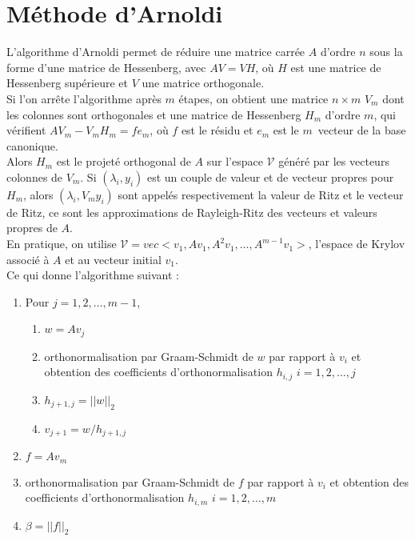 \section{Méthode d'Arnoldi}
\label{arnoldi}
L'algorithme d'Arnoldi permet de réduire une matrice carrée $A$ d'ordre $n$ sous la forme d'une matrice de Hessenberg, avec $AV = VH$, où $H$ est une matrice de Hessenberg supérieure et $V$ une matrice orthogonale.\\
Si l'on arrête l'algorithme après $m$ étapes, on obtient une matrice $n\times m$ $V_m$ dont les colonnes sont orthogonales et une matrice de Hessenberg $H_m$ d'ordre $m$, qui vérifient $AV_m - V_mH_m = fe_m$, où $f$ est le résidu et $e_m$ est le $m$\ieme\ vecteur de la base canonique.\\
Alors $H_m$ est le projeté orthogonal de $A$ sur l'espace $\mathcal{V}$ généré par les vecteurs colonnes de $V_m$. Si $(\lambda_i, y_i)$ est un couple de valeur et de vecteur propres pour $H_m$, alors $(\lambda_i, V_my_i)$ sont appelés respectivement la valeur de Ritz et le vecteur de Ritz, ce sont les approximations de Rayleigh-Ritz des vecteurs et valeurs propres de $A$.\\
En pratique, on utilise $\mathcal{V}= vec<v_1, Av_1, A^2v_1,\dots,A^{m-1}v_1>$, l'espace de Krylov associé à $A$ et au vecteur initial $v_1$.\\

Ce qui donne l'algorithme suivant :
\begin{enumerate}
\item Pour $j=1,2,\dots,m-1$,
\begin{enumerate}
\item $w=Av_j$
\item orthonormalisation par Graam-Schmidt de $w$ par rapport à $v_i$ et obtention des coefficients d'orthonormalisation $h_{i,j}$ $i=1,2,\dots,j$
\item $h_{j+1,j}=||w||_2$
\item $v_{j+1}=w/h_{j+1,j}$
\end{enumerate}
\item $f=Av_m$
\item orthonormalisation par Graam-Schmidt de $f$ par rapport à $v_i$ et obtention des coefficients d'orthonormalisation $h_{i,m}$ $i=1,2,\dots,m$
\item $\beta=||f||_2$
\end{enumerate}

